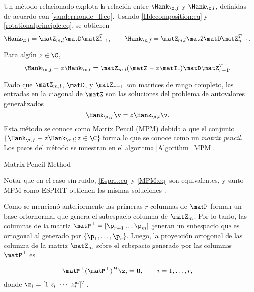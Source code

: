 	Un	método relacionado explota la relación entre $	\Hank_{\x,f}$ y $\Hank_{\x,l}$, definidas de acuerdo con \eqref{vandermonde_lf:eq}. Usando  \eqref{Hdecomposition:eq} y \eqref{rotationalprinciple:eq}, se obtienen
	\begin{equation}
		\Hank_{\x,l} = \matZ_{m,l}\matD\matZ_{r-1}^T, \qquad 	\Hank_{\x,f} = \matZ_{m,l}\matZ\matD\matZ_{n-1}^T.
		\label{eq:VandermondeDecomposition}
	\end{equation}

	Para algún $z\in \C$, 
	\[\Hank_{\x,f} -z \Hank_{\x,l} = \matZ_{m,l}(\matZ-z\matI_r)\matD\matZ_{r-1}^T.
	\]

	Dado que $\matZ_{m,l}$, $\matD$, y $\matZ_{r-1}$ son matrices de rango completo, los entradas en la diagonal de $\matZ$ son las soluciones del problema de autovalores generalizados
	\begin{equation}
		\Hank_{\x,f} \v = z \Hank_{\x,l}\v.
		\label{MPM:eq}
	\end{equation}
	Esta método se conoce como Matrix Pencil (MPM) \cite{Hua1990} debido a que el conjunto  $\{\Hank_{\x,f} -z \Hank_{\x,l}; z \in \C\}$ forma lo que se conoce como un \emph{matrix pencil}. Los pasos del método se muestran en el algoritmo \eqref{Algorithm_MPM}.

	\begin{algorithm}
		\caption{Matrix Pencil Method}
		\begin{algorithmic}[1]
		\end{algorithmic}
		\label{Algorithm_MPM}
	\end{algorithm}		
	Notar que en el caso sin ruido, \eqref{Esprit:eq} y \eqref{MPM:eq} son equivalentes, y tanto MPM como ESPRIT obtienen las mismas soluciones \cite{Hua1991}.	

	Como se mencionó anteriormente las primeras $r$ columnas de $\matP$ forman un base ortornormal que genera el subespacio columna de $\matZ_m$. Por lo tanto, las columnas de la matriz $\matP^\perp = [\p_{r+1}\ldots\p_{m}]$ generan un subespacio que es ortogonal al generado por $\{\p_1,\ldots,\p_r\}$. Luego, la proyección ortogonal de las columna de la matriz $\matZ_m$ sobre el subspacio generado por las columnas $\matP^\perp$ es 

	\begin{equation}
		\matP^\perp(\matP^\perp)^H\z_i = \mathbf{0}, \qquad i = 1,\ldots,r,
	\end{equation}
	donde $\z_i = [1\ z_i\ \cdots\  z_i^{m}]^T$.

